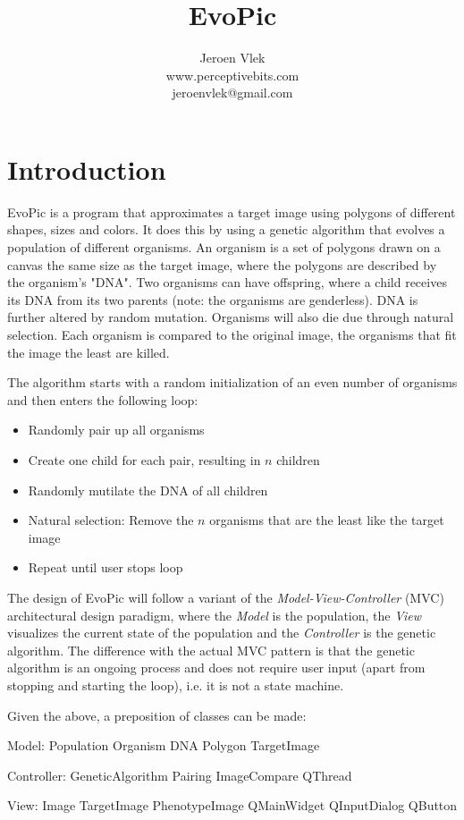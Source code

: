 \documentclass[a4paper, 11pt, onecolumn]{article}
\author{Jeroen Vlek\\www.perceptivebits.com\\jeroenvlek@gmail.com}
\title{EvoPic}
\begin{document}

\section{Introduction}
 
EvoPic is a program that approximates a target image using polygons of different
shapes, sizes and colors. It does this by using a genetic algorithm that evolves
a population of different organisms. An organism is a set of polygons drawn on a
canvas the same size as the target image, where the polygons are described by
the organism's "DNA". Two organisms can have offspring, where a child receives
its DNA from its two parents (note: the organisms are genderless). DNA is
further altered by random mutation. Organisms will also die due through natural
selection. Each organism is compared to the original image, the organisms that
fit the image the least are killed.

The algorithm starts with a random initialization of an even number of organisms
and then enters the following loop:

\begin{itemize}
\item Randomly pair up all organisms
\item Create one child for each pair, resulting in $n$ children
\item Randomly mutilate the DNA of all children
\item Natural selection: Remove the $n$ organisms that are the least like the
target image 
\item Repeat until user stops loop
\end{itemize}

The design of EvoPic will follow a variant of the \textit{Model-View-Controller}
(MVC) architectural design paradigm, where the \textit{Model} is the population,
the \textit{View} visualizes the current state of the population and the
\textit{Controller} is the genetic algorithm. The difference with the
actual MVC pattern is that the genetic algorithm is an ongoing process and does
not require user input (apart from stopping and starting the loop), i.e. it is
not a state machine.

Given the above, a preposition of classes can be made:

Model: 
Population
Organism 
DNA
Polygon
TargetImage

Controller:
GeneticAlgorithm
Pairing
ImageCompare
QThread

View:
Image
TargetImage
PhenotypeImage
QMainWidget
QInputDialog
QButton
\end{document}

